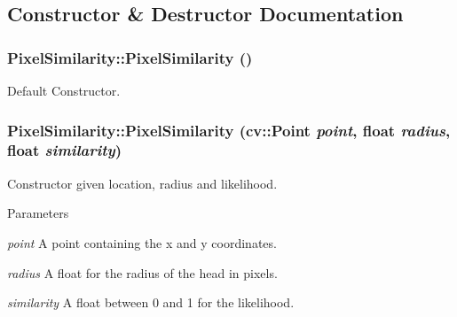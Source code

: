 \subsection{Constructor \& Destructor Documentation}
\hypertarget{classPixelSimilarity_a8d2c663a253dafb804765764e2dea32a}{
\subsubsection[{PixelSimilarity}]{\setlength{\rightskip}{0pt plus 5cm}PixelSimilarity::PixelSimilarity ()}}
\label{classPixelSimilarity_a8d2c663a253dafb804765764e2dea32a}
Default Constructor. \hypertarget{classPixelSimilarity_a0816faaaedb8d0e1ffe0aa40a438df4e}{
\subsubsection[{PixelSimilarity}]{\setlength{\rightskip}{0pt plus 5cm}PixelSimilarity::PixelSimilarity (cv::Point {\em point}, \/  float {\em radius}, \/  float {\em similarity})}}
\label{classPixelSimilarity_a0816faaaedb8d0e1ffe0aa40a438df4e}
Constructor given location, radius and likelihood. 
\begin{DoxyParams}{Parameters}
\item[{\em point}]A point containing the x and y coordinates. \item[{\em radius}]A float for the radius of the head in pixels. \item[{\em similarity}]A float between 0 and 1 for the likelihood. \end{DoxyParams}


